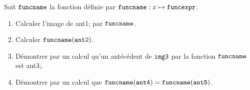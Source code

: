 \documentclass[exercice]{thedocument}%
\begin{document}
%
Soit $\<funcname;$ la fonction définie par $\<funcname;:x\mapsto\<funcexpr;$.
\begin{enumerate}
    \item Calculer l'image de \<ant1; par $\<funcname;$.
    \item Calculer $\<funcname;(\<ant2;)$.
    \item Démontrer par un calcul qu'un antécédent de $\<img3;$ par la fonction $\<funcname;$ est \<ant3;.
    \item Démontrer par un calcul que $\<funcname;(\<ant4;)=\<funcname;(\<ant5;)$.
\end{enumerate}
\end{document}
